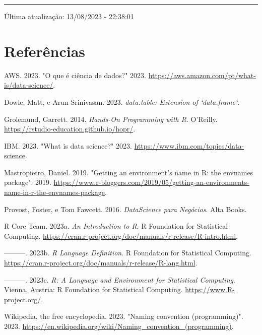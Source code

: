 \documentclass[
  letterpaper,
  DIV=11,
  numbers=noendperiod]{scrreprt}
\newlength{\cslhangindent}
\newlength{\cslentryspacingunit} %
\newenvironment{CSLReferences}[2] %
 {%
  \setlength{\parindent}{0pt}
  \ifodd #1
  \let\oldpar\par
  \def\par{\hangindent=\cslhangindent\oldpar}
  \fi
  \setlength{\parskip}{#2\cslentryspacingunit}
 }%
 {}
\begin{document}
\begin{center}\rule{0.5\linewidth}{0.5pt}\end{center}

Última atualização: 13/08/2023 - 22:38:01


\hypertarget{referuxeancias}{%
\chapter*{Referências}\label{referuxeancias}}


\hypertarget{refs}{}
\begin{CSLReferences}{1}{0}
\leavevmode{}%
AWS. 2023. {"O que é ciência de dados?"} 2023.
\url{https://aws.amazon.com/pt/what-is/data-science/}.

\leavevmode{}%
Dowle, Matt, e Arun Srinivasan. 2023. \emph{data.table: Extension of
`data.frame`}.

\leavevmode{}%
Grolemund, Garrett. 2014. \emph{Hands-On Programming with R}. O'Reilly.
\url{https://rstudio-education.github.io/hopr/}.

\leavevmode{}%
IBM. 2023. {"What is data science?"} 2023.
\url{https://www.ibm.com/topics/data-science}.

\leavevmode{}%
Mastropietro, Daniel. 2019. {"Getting an environment's name in R: the
envnames package"}. 2019.
\url{https://www.r-bloggers.com/2019/05/getting-an-environments-name-in-r-the-envnames-package}.

\leavevmode{}%
Provost, Foster, e Tom Fawcett. 2016. \emph{DataScience para Negócios}.
Alta Books.

\leavevmode{}%
R Core Team. 2023a. \emph{An Introduction to R}. R Foundation for
Statistical Computing.
\url{https://cran.r-project.org/doc/manuals/r-release/R-intro.html}.

\leavevmode{}%
---------. 2023b. \emph{R Language Definition}. R Foundation for
Statistical Computing.
\url{https://cran.r-project.org/doc/manuals/r-release/R-lang.html}.

\leavevmode{}%
---------. 2023c. \emph{R: A Language and Environment for Statistical
Computing}. Vienna, Austria: R Foundation for Statistical Computing.
\url{https://www.R-project.org/}.

\leavevmode{}%
Wikipedia, the free encyclopedia. 2023. {"Naming convention
(programming)"}. 2023.
\url{https://en.wikipedia.org/wiki/Naming_convention_(programming)}.

\end{CSLReferences}
\end{document}
